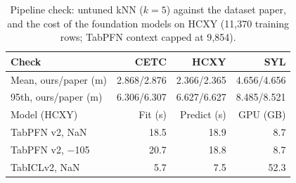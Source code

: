 \begin{table}[t]
\centering
\caption{Pipeline check: untuned kNN ($k{=}5$) against the dataset paper, and the cost of the foundation models on HCXY (11{,}370 training rows; TabPFN context capped at 9{,}854).}
\label{tab:setup}
\setlength{\tabcolsep}{3.5pt}
\footnotesize
\begin{tabular}{@{}lrrr@{}}
\toprule
Check & CETC & HCXY & SYL \\
\midrule
Mean, ours/paper (m) & 2.868/2.876 & 2.366/2.365 & 4.656/4.656 \\
95th, ours/paper (m) & 6.306/6.307 & 6.627/6.627 & 8.485/8.521 \\
\midrule
Model (HCXY) & Fit (s) & Predict (s) & GPU (GB) \\
\midrule
TabPFN v2, NaN & 18.5 & 18.9 & 8.7 \\
TabPFN v2, $-$105 & 20.7 & 18.8 & 8.7 \\
TabICLv2, NaN & 5.7 & 7.5 & 52.3 \\
\bottomrule
\end{tabular}
\end{table}
